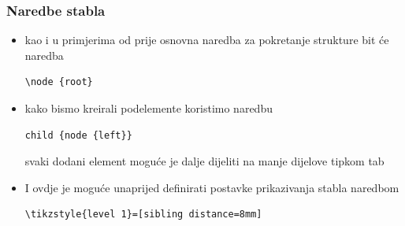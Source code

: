 \documentclass{beamer}
\begin{document}
\begin{frame}[fragile]
	\frametitle{Naredbe stabla}
		\begin{itemize}
		\item kao i u primjerima od prije osnovna naredba za pokretanje strukture bit će naredba\begin{verbatim}\node {root}\end{verbatim}
		\item kako bismo kreirali podelemente koristimo naredbu 
		\begin{verbatim}child {node {left}}\end{verbatim} svaki dodani element moguće je dalje dijeliti na manje dijelove tipkom tab
		\item I ovdje je moguće unaprijed definirati postavke prikazivanja stabla naredbom
		\begin{verbatim}\tikzstyle{level 1}=[sibling distance=8mm]\end{verbatim}
		\end{itemize}	
\end{frame}	
\end{document}
